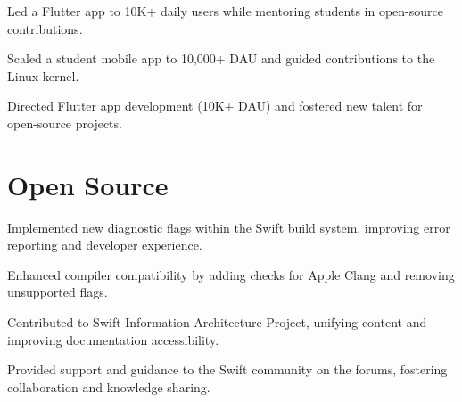\documentclass{fonts}
\begin{document}
\textbf{\href{}{}} 
\begin{tightemize}
     \item Led a Flutter app to 10K+ daily users while mentoring students in open-source contributions.
     \item Scaled a student mobile app to 10,000+ DAU and guided contributions to the Linux kernel.
     \item Directed Flutter app development (10K+ DAU) and fostered new talent for open-source projects.
\end{tightemize}


\section{Open Source}

\textbf{}
\begin{tightemize}
    \item Implemented new diagnostic flags within the Swift build system, improving error reporting and developer experience.
    \item Enhanced compiler compatibility by adding checks for Apple Clang and removing unsupported flags.
    \item Contributed to Swift Information Architecture Project, unifying content and improving documentation accessibility.
    \item Provided support and guidance to the Swift community on the forums, fostering collaboration and knowledge sharing.
\end{tightemize}
\sectionsep



\end{document}
